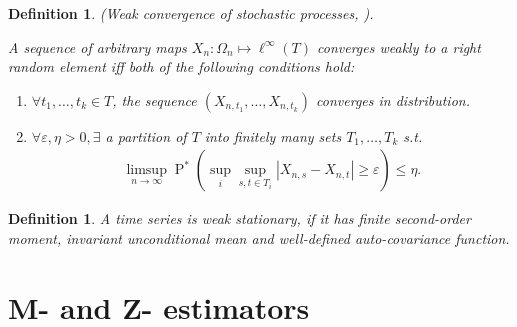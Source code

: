 \documentclass[12pt,a4paper]{article}
\newcommand{\pr}{\mathop{\mathrm{P}}}
\newtheorem{definition}[theorem]{Definition}
\begin{document}
\begin{definition}
  (Weak convergence of stochastic processes, \citet[page 261, thm 18.4]{vaart}).

  A sequence of arbitrary maps $X_n:\Omega_n\mapsto \ell^\infty(T)$ converges weakly to a right random element iff both of the following conditions hold:
  \begin{enumerate}
	\item $\forall t_1,\dots, t_k \in T$, the sequence $(X_{n,t_1},\dots,X_{n,t_k})$ converges in distribution.
	  \item $\forall \varepsilon, \eta>0, \exists$ a partition of $T$ into finitely many sets $T_1,\dots,T_k$ s.t.
		\begin{align*}
		  \limsup_{n\to\infty} \pr^*\left( \sup_{i}\sup_{s,t\in T_i}|X_{n,s}-X_{n,t}|\ge \varepsilon \right) \le \eta.
		\end{align*}
  \end{enumerate}
\end{definition}


\begin{definition}
  A time series is weak stationary, if it has finite second-order moment, invariant unconditional mean and well-defined auto-covariance function.
\end{definition}
\section{M- and Z- estimators}
\end{document}
